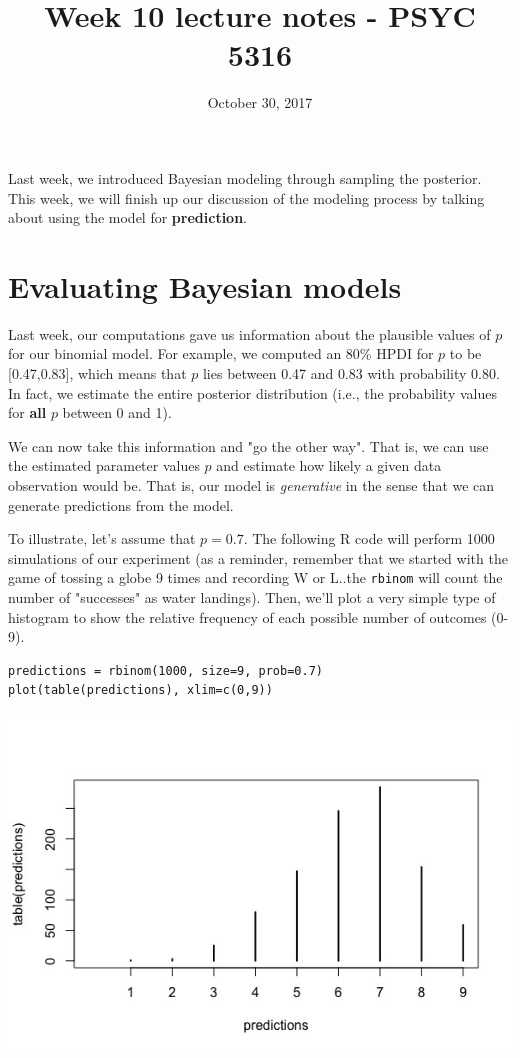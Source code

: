 \documentclass[11pt]{article}
\date{October 30, 2017}
\title{Week 10 lecture notes - PSYC 5316}
\begin{document}
\maketitle
Last week, we introduced Bayesian modeling through sampling the posterior.  This week, we will finish up our discussion of the modeling process by talking about using the model for \textbf{prediction}.

\section*{Evaluating Bayesian models}
\label{sec-1}
Last week, our computations gave us information about the plausible values of $p$ for our binomial model.  For example, we computed an 80\% HPDI for $p$ to be [0.47,0.83], which means that $p$ lies between 0.47 and 0.83 with probability 0.80.  In fact, we estimate the entire posterior distribution (i.e., the probability values for \textbf{all} $p$ between 0 and 1).

We can now take this information and "go the other way".  That is, we can use the estimated parameter values $p$ and estimate how likely a given data observation would be.  That is, our model is \emph{generative} in the sense that we can generate predictions from the model.

To illustrate, let's assume that $p=0.7$.  The following R code will perform 1000 simulations of our experiment (as a reminder, remember that we started with the game of tossing a globe 9 times and recording W or L..the \texttt{rbinom} will count the number of "successes" as water landings). Then, we'll plot a very simple type of histogram to show the relative frequency of each possible number of outcomes (0-9).

\begin{verbatim}
predictions = rbinom(1000, size=9, prob=0.7)
plot(table(predictions), xlim=c(0,9))
\end{verbatim}

\includegraphics[width=.9\linewidth]{figures/week9/predict1.jpeg}
\end{document}
